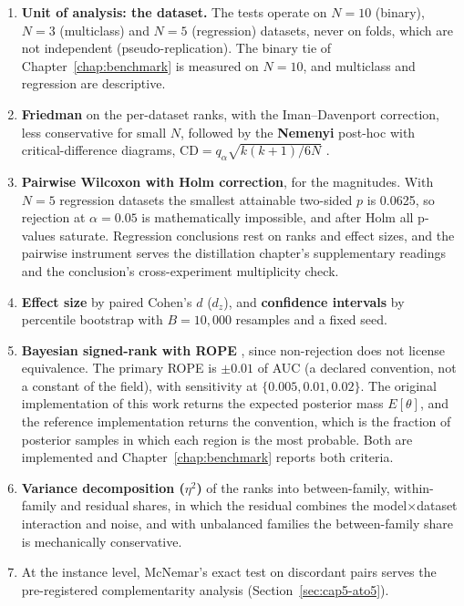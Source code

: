 \begin{enumerate}
  \item \textbf{Unit of analysis: the dataset.} The tests operate on
    $N=10$ (binary), $N=3$ (multiclass) and $N=5$ (regression)
    datasets, never on folds, which are not independent
    (pseudo-replication). The binary tie of Chapter~\ref{chap:benchmark}
    is measured on $N=10$, and multiclass and regression are
    descriptive.
  \item \textbf{Friedman} on the per-dataset ranks, with the
    Iman--Davenport correction, less conservative for small $N$,
    followed by the \textbf{Nemenyi} post-hoc with
    critical-difference diagrams,
    $\mathrm{CD} = q_\alpha \sqrt{k(k+1)/6N}$ \citep{demsar2006}.
  \item \textbf{Pairwise Wilcoxon with Holm correction}, for the
    magnitudes. With $N=5$ regression datasets the smallest
    attainable two-sided $p$ is 0.0625, so rejection at
    $\alpha=0.05$ is mathematically impossible, and after Holm all
    p-values saturate. Regression conclusions rest on ranks and
    effect sizes, and the pairwise instrument serves the
    distillation chapter's supplementary readings and the
    conclusion's cross-experiment multiplicity check.
  \item \textbf{Effect size} by paired Cohen's $d$ ($d_z$), and
    \textbf{confidence intervals} by percentile bootstrap with
    $B=10{,}000$ resamples and a fixed seed.
  \item \textbf{Bayesian signed-rank with ROPE}
    \citep{benavoli2017}, since non-rejection does not license
    equivalence. The primary ROPE is $\pm0.01$ of AUC (a declared
    convention, not a constant of the field), with sensitivity at
    $\{0.005, 0.01, 0.02\}$. The original implementation of this
    work returns the expected posterior mass $E[\theta]$, and the
    reference implementation returns the \citet{benavoli2017}
    convention, which is the fraction of posterior samples in which
    each region is the most probable. Both are implemented and
    Chapter~\ref{chap:benchmark} reports both criteria.
  \item \textbf{Variance decomposition ($\eta^2$)} of the ranks into
    between-family, within-family and residual shares, in which the residual combines the model$\times$dataset interaction and noise, and
    with unbalanced families the between-family share is
    mechanically conservative.
  \item At the instance level, McNemar's exact test on discordant
    pairs \citep{mcnemar1947} serves the pre-registered
    complementarity analysis (Section~\ref{sec:cap5-ato5}).
\end{enumerate}

